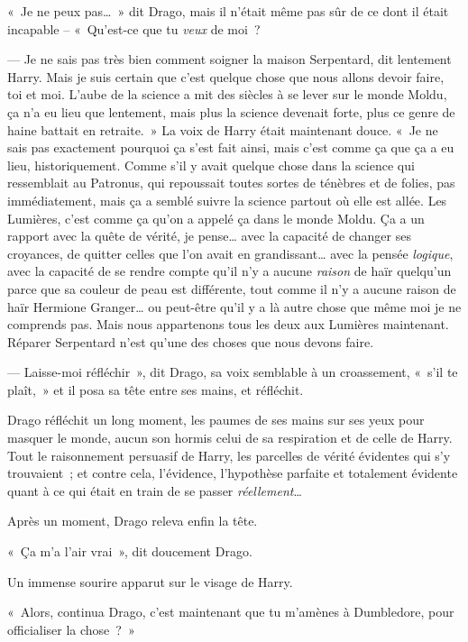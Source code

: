 «~Je ne peux pas…~» dit Drago, mais il n'était même pas sûr de ce dont il était incapable -- «~Qu'est-ce que tu \emph{veux} de moi~?

--- Je ne sais pas très bien comment soigner la maison Serpentard, dit lentement Harry. Mais je suis certain que c'est quelque chose que nous allons devoir faire, toi et moi. L'aube de la science a mit des siècles à se lever sur le monde Moldu, ça n'a eu lieu que lentement, mais plus la science devenait forte, plus ce genre de haine battait en retraite.~» La voix de Harry était maintenant douce. «~Je ne sais pas exactement pourquoi ça s'est fait ainsi, mais c'est comme ça que ça a eu lieu, historiquement. Comme s'il y avait quelque chose dans la science qui ressemblait au Patronus, qui repoussait toutes sortes de ténèbres et de folies, pas immédiatement, mais ça a semblé suivre la science partout où elle est allée. Les Lumières, c'est comme ça qu'on a appelé ça dans le monde Moldu. Ça a un rapport avec la quête de vérité, je pense… avec la capacité de changer ses croyances, de quitter celles que l'on avait en grandissant… avec la pensée \emph{logique}, avec la capacité de se rendre compte qu'il n'y a aucune \emph{raison} de haïr quelqu'un parce que sa couleur de peau est différente, tout comme il n'y a aucune raison de haïr Hermione Granger… ou peut-être qu'il y a là autre chose que même moi je ne comprends pas. Mais nous appartenons tous les deux aux Lumières maintenant. Réparer Serpentard n'est qu'une des choses que nous devons faire.

--- Laisse-moi réfléchir~», dit Drago, sa voix semblable à un croassement, «~s'il te plaît,~» et il posa sa tête entre ses mains, et réfléchit.

\later

Drago réfléchit un long moment, les paumes de ses mains sur ses yeux pour masquer le monde, aucun son hormis celui de sa respiration et de celle de Harry. Tout le raisonnement persuasif de Harry, les parcelles de vérité évidentes qui s'y trouvaient~; et contre cela, l'évidence, l'hypothèse parfaite et totalement évidente quant à ce qui était en train de se passer \emph{réellement}…

Après un moment, Drago releva enfin la tête.

«~Ça m'a l'air vrai~», dit doucement Drago.

Un immense sourire apparut sur le visage de Harry.

«~Alors, continua Drago, c'est maintenant que tu m'amènes à Dumbledore, pour officialiser la chose~?~»

